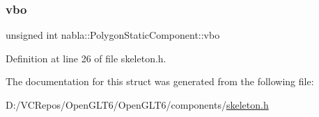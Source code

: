 \subsubsection{\texorpdfstring{vbo}{vbo}}
{\footnotesize\ttfamily unsigned int nabla\+::\+Polygon\+Static\+Component\+::vbo}



Definition at line 26 of file skeleton.\+h.



The documentation for this struct was generated from the following file\+:\begin{DoxyCompactItemize}
\item 
D\+:/\+V\+C\+Repos/\+Open\+G\+L\+T6/\+Open\+G\+L\+T6/components/\mbox{\hyperlink{skeleton_8h}{skeleton.\+h}}\end{DoxyCompactItemize}
